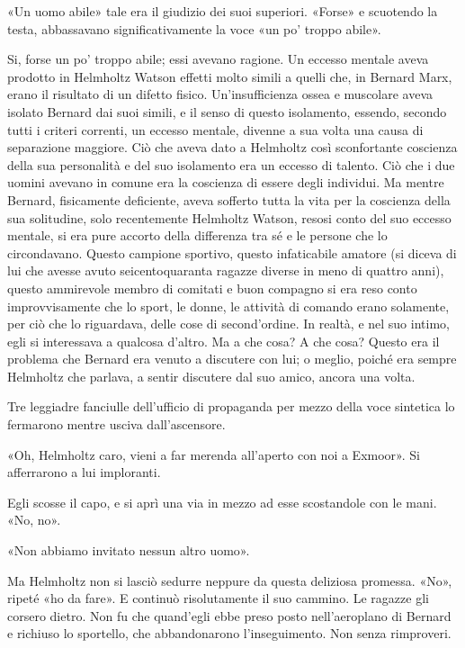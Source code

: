 \documentclass[
a5paper, %
10pt, %
twoside, 
onecolumn, %
openany, %
]{memoir}
\begin{document}
«Un uomo abile» tale era il giudizio dei suoi superiori. «Forse» e scuotendo la testa, abbassavano significativamente la voce «un po’ troppo abile».

Si, forse un po’ troppo abile; essi avevano ragione. Un eccesso mentale aveva prodotto in Helmholtz Watson effetti molto simili a quelli che, in Bernard Marx, erano il risultato di un difetto fisico. Un’insufficienza ossea e muscolare aveva isolato Bernard dai suoi simili, e il senso di questo isolamento, essendo, secondo tutti i criteri correnti, un eccesso mentale, divenne a sua volta una causa di separazione maggiore. Ciò che aveva dato a Helmholtz così sconfortante coscienza della sua personalità e del suo isolamento era un eccesso di talento. Ciò che i due uomini avevano in comune era la coscienza di essere degli individui. Ma mentre Bernard, fisicamente deficiente, aveva sofferto tutta la vita per la coscienza della sua solitudine, solo recentemente Helmholtz Watson, resosi conto del suo eccesso mentale, si era pure accorto della differenza tra sé e le persone che lo circondavano. Questo campione sportivo, questo infaticabile amatore (si diceva di lui che avesse avuto seicentoquaranta ragazze diverse in meno di quattro anni), questo ammirevole membro di comitati e buon compagno si era reso conto improvvisamente che lo sport, le donne, le attività di comando erano solamente, per ciò che lo riguardava, delle cose di second’ordine. In realtà, e nel suo intimo, egli si interessava a qualcosa d’altro. Ma a che cosa? A che cosa? Questo era il problema che Bernard era venuto a discutere con lui; o meglio, poiché era sempre Helmholtz che parlava, a sentir discutere dal suo amico, ancora una volta.

Tre leggiadre fanciulle dell’ufficio di propaganda per mezzo della voce sintetica lo fermarono mentre usciva dall’ascensore.

«Oh, Helmholtz caro, vieni a far merenda all’aperto con noi a Exmoor». Si afferrarono a lui imploranti.

Egli scosse il capo, e si aprì una via in mezzo ad esse scostandole con le mani. «No, no».

«Non abbiamo invitato nessun altro uomo».

Ma Helmholtz non si lasciò sedurre neppure da questa deliziosa promessa. «No», ripeté «ho da fare». E continuò risolutamente il suo cammino. Le ragazze gli corsero dietro. Non fu che quand’egli ebbe preso posto nell’aeroplano di Bernard e richiuso lo sportello, che abbandonarono l’inseguimento. Non senza rimproveri.
\end{document}
